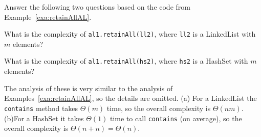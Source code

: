 \begin{exer}
Answer the following two questions based on the code from Example~\ref{exa:retainAllAL}.
\begin{lenum}
\item
What is the complexity of \verb+al1.retainAll(ll2)+, 
where \verb+ll2+ is a LinkedList with $m$ elements?
\answerlinetwo
\item
What is the complexity of \verb+al1.retainAll(hs2)+, 
where \verb+hs2+ is a HashSet with $m$ elements?
\answerlinetwo
\end{lenum}
\begin{answer}
The analysis of these is very similar to the analysis of Examples~\ref{exa:retainAllAL}, so the details are omitted.
(a) For a LinkedList the \verb+contains+ method takes $\Theta(m)$ time, so the overall
complexity is $\Theta(nm)$.
(b)For a HashSet it takes $\Theta(1)$ time to call \verb+contains+ (on average), so
the overall complexity is $\Theta(n+n)=\Theta(n)$.
\end{answer}
\end{exer}








